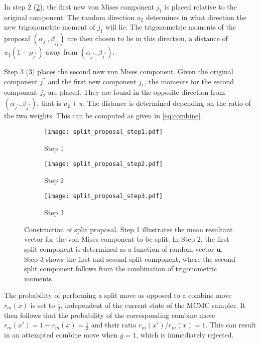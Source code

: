 In step 2 (\ref{fig:split-2}), the first new von Mises component $j_1$ is placed relative to the original component. The random direction $u_2$ determines in what direction the new trigonometric moment of $j_1$ will lie. The trigonometric moments of the proposal $(\alpha_{j_1}, \beta_{j_1})$ are then chosen to lie in this direction, a distance of $u_3 (1 - \rho_{j^*})$ away from $(\alpha_{j^*}, \beta_{j^*})$. 

Step 3 (\ref{fig:split-3}) places the second new von Mises component. Given the original component $j^*$ and the first new component $j_1$, the moments for the second component $j_2$ are placed. They are found in the opposite direction from $(\alpha_{j^*}, \beta_{j^*})$, that is $u_2 + \pi$. The distance is determined depending on the ratio of the two weights. This can be computed as given in \eqref{eq:combine}.

\begin{figure}
	\centering
	\begin{subfigure}[b]{0.3\textwidth}
		\texttt{[image: split\_proposal\_step1.pdf]}
		\caption{Step 1}
		\label{fig:split-1}
	\end{subfigure}
	\begin{subfigure}[b]{0.3\textwidth}
		\texttt{[image: split\_proposal\_step2.pdf]}
		\caption{Step 2}
		\label{fig:split-2}
	\end{subfigure}
	\begin{subfigure}[b]{0.3\textwidth}
		\texttt{[image: split\_proposal\_step3.pdf]}
		\caption{Step 3}
		\label{fig:split-3}
	\end{subfigure}
	\caption{Construction of split proposal. Step 1 illustrates the mean resultant vector for the von Mises component to be split. In Step 2, the first split component is determined as a function of random vector $\bm u$. Step 3 shows the first and second split component, where the second split component follows from the combination of trigonometric moments.}
	\label{fig:split-proposal}
\end{figure}

The probability of performing a split move as opposed to a combine move $r_m(x)$ is set to $\frac{1}{2}$, independent of the current state of the MCMC sampler. It then follows that the probability of the corresponding combine move $r_m(x') = 1-r_m(x) = \frac{1}{2}$ and their ratio $r_m(x') / r_m(x) = 1$. This can result in an attempted combine move when $g=1$, which is immediately rejected.

